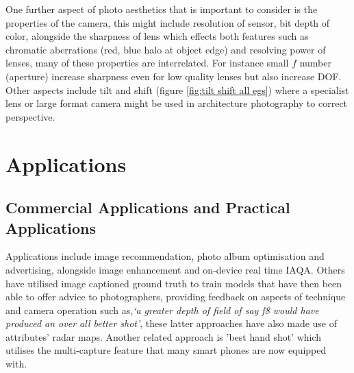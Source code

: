 One further aspect of photo aesthetics that is important to consider is the properties of the camera, this might include resolution of sensor, bit depth of color, alongside the sharpness of lens which effects both features such as chromatic aberrations (red, blue halo at object edge) and resolving power of lenses, many of these properties are interrelated. For instance small $f$ number (aperture) increase sharpness even for low quality lenses but also increase DOF. Other aspects include tilt and shift (figure \ref{fig:tilt shift all egs}) where a specialist lens or large format camera might be used in architecture photography to correct perspective. 



\newpage    
\section{Applications}


\subsection{Commercial Applications and Practical Applications}

Applications include image recommendation, photo album optimisation\cite{Liu2017} and advertising, alongside image enhancement\cite{Talebi2018} and on-device real time IAQA. Others have utilised image captioned ground truth to train models that have then been able to offer advice to photographers, providing feedback on aspects of technique and camera operation such as,\textit{`a greater depth of field of say f8 would have produced an over all better shot'}\cite{Jin2019}, these latter approaches have also made use of attributes' radar maps\cite{Jin2019}. Another related approach is 'best hand shot'\cite{Schwarz2018a} which utilises the multi-capture feature that many smart phones are now equipped with.

